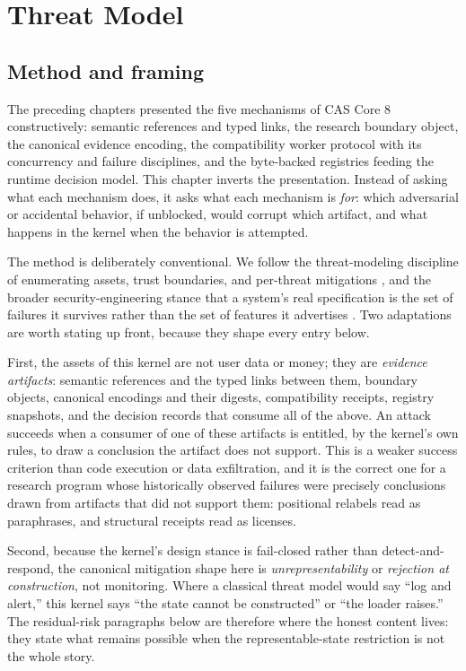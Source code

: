 \chapter{Threat Model}\label{threat:chapter}

\section{Method and framing}\label{threat:method}

The preceding chapters presented the five mechanisms of CAS Core 8 constructively: semantic references and typed links, the research boundary object, the canonical evidence encoding, the compatibility worker protocol with its concurrency and failure disciplines, and the byte-backed registries feeding the runtime decision model. This chapter inverts the presentation. Instead of asking what each mechanism does, it asks what each mechanism is \emph{for}: which adversarial or accidental behavior, if unblocked, would corrupt which artifact, and what happens in the kernel when the behavior is attempted.

The method is deliberately conventional. We follow the threat-modeling discipline of enumerating assets, trust boundaries, and per-threat mitigations \cite{shostack}, and the broader security-engineering stance that a system's real specification is the set of failures it survives rather than the set of features it advertises \cite{anderson}. Two adaptations are worth stating up front, because they shape every entry below.

First, the assets of this kernel are not user data or money; they are \emph{evidence artifacts}: semantic references and the typed links between them, boundary objects, canonical encodings and their digests, compatibility receipts, registry snapshots, and the decision records that consume all of the above. An attack succeeds when a consumer of one of these artifacts is entitled, by the kernel's own rules, to draw a conclusion the artifact does not support. This is a weaker success criterion than code execution or data exfiltration, and it is the correct one for a research program whose historically observed failures were precisely conclusions drawn from artifacts that did not support them: positional relabels read as paraphrases, and structural receipts read as licenses.

Second, because the kernel's design stance is fail-closed rather than detect-and-respond, the canonical mitigation shape here is \emph{unrepresentability} or \emph{rejection at construction}, not monitoring. Where a classical threat model would say ``log and alert,'' this kernel says ``the state cannot be constructed'' or ``the loader raises.'' The residual-risk paragraphs below are therefore where the honest content lives: they state what remains possible when the representable-state restriction is not the whole story.


